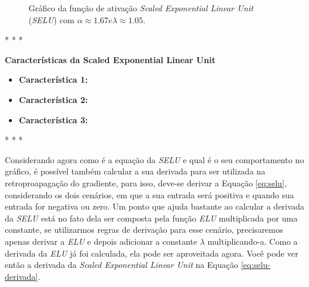 \begin{figure}[h!]
    \centering
    \caption{Gráfico da função de ativação \textit{Scaled Exponential Linear Unit} (\textit{SELU}) com $\alpha \approx 1.67 e \lambda \approx 1.05$.}
    \label{fig:selu}
\end{figure}

\medskip
\begin{center}
 * * *
\end{center}
\medskip

\textbf{Características da Scaled Exponential Linear Unit}
\vspace{1em}

\begin{itemize}
    \item \textbf{Característica 1:}
    \item \textbf{Característica 2:}
    \item \textbf{Característica 3:}
\end{itemize}

\medskip
\begin{center}
 * * *
\end{center}
\medskip

Considerando agora como é a equação da \textit{SELU} e qual é o seu comportamento no gráfico, é possível também calcular a sua derivada para ser utilizada na retroproapagação do gradiente, para isso, deve-se derivar a Equação \ref{eq:selu}, considerando os dois cenários, em que a sua entrada será positiva e quando sua entrada for negativa ou zero. Um ponto que ajuda bastante ao calcular a derivada da \textit{SELU} está no fato dela ser composta pela função \textit{ELU} multiplicada por uma constante, se utilizarmos regras de derivação para esse cenário, precisaremos apenas derivar a \textit{ELU} e depois adicionar a constante $\lambda$ multiplicando-a. Como a derivada da \textit{ELU} já foi calculada, ela pode ser aproveitada agora. Você pode ver então a derivada da \textit{Scaled Exponential Linear Unit} na Equação \ref{eq:selu-derivada}.


